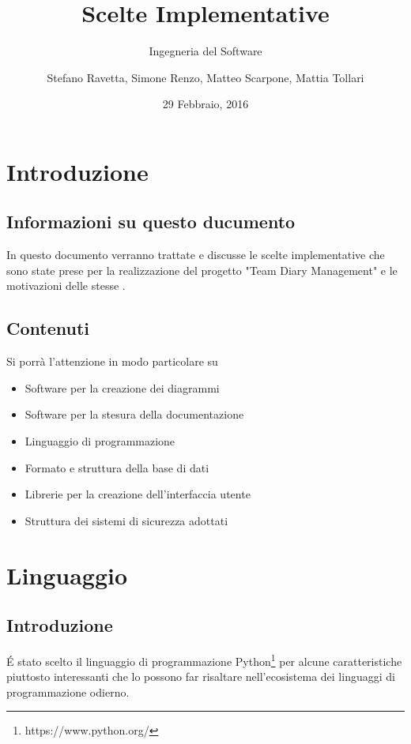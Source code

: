 \documentclass[12pt]{scrartcl}
\title{Scelte Implementative}
\subtitle{Ingegneria del Software}
\author{Stefano Ravetta, Simone Renzo, Matteo Scarpone, Mattia Tollari}
\date{29 Febbraio, 2016}
\begin{document}
\maketitle


\section{Introduzione}	%

\subsection{Informazioni su questo ducumento}
In questo documento verranno trattate e discusse le scelte
implementative che sono state prese per la realizzazione del progetto "Team Diary Management"
e le motivazioni delle stesse .

\subsection{Contenuti}
Si porr\`a l'attenzione in modo particolare su
\begin{itemize}
    \item Software per la creazione dei diagrammi
    \item Software per la stesura della documentazione
    \item Linguaggio di programmazione
    \item Formato e struttura della base di dati
    \item Librerie per la creazione dell'interfaccia utente
    \item Struttura dei sistemi di sicurezza adottati
\end{itemize}

\section{Linguaggio}
\subsection{Introduzione}
\'E stato scelto il linguaggio di programmazione Python\footnote{https://www.python.org/} per alcune caratteristiche
piuttosto interessanti che lo possono far risaltare nell'ecosistema dei linguaggi di programmazione odierno.
\end{document}
